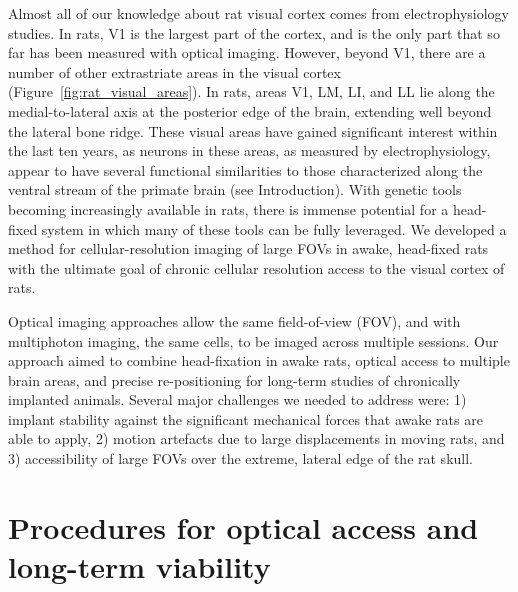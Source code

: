 Almost all of our knowledge about rat visual cortex comes from electrophysiology studies. In rats, V1 is the largest part of the cortex, and is the only part that so far has been measured with optical imaging\cite{Gias2005, Scott2018, Ohki2005}. However, beyond V1, there are a number of other extrastriate areas in the visual cortex \cite{Espinoza1983, Sereno1991} (Figure~\ref{fig:rat_visual_areas}). In rats, areas V1, LM, LI, and LL lie along the medial-to-lateral axis at the posterior edge of the brain, extending well beyond the lateral bone ridge. These visual areas have gained significant interest within the last ten years, as neurons in these areas, as measured by electrophysiology, appear to have several functional similarities to those characterized along the ventral stream of the primate brain (see Introduction). With genetic tools becoming increasingly available in rats, there is immense potential for a head-fixed system in which many of these tools can be fully leveraged. We developed a method for cellular-resolution imaging of large FOVs in awake, head-fixed rats with the ultimate goal of chronic cellular resolution access to the visual cortex of rats. 

Optical imaging approaches allow the same field-of-view (FOV), and with multiphoton imaging, the same cells, to be imaged across multiple sessions. Our approach aimed to combine head-fixation in awake rats, optical access to multiple brain areas, and precise re-positioning for long-term studies of chronically implanted animals. Several major challenges we needed to address were:  1) implant stability against the significant mechanical forces that awake rats are able to apply, 2) motion artefacts due to large displacements in moving rats, and 3) accessibility of large FOVs over the extreme, lateral edge of the rat skull.


\section{Procedures for optical access and long-term viability} 

